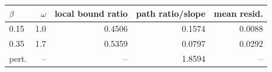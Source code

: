 \begin{tabular}{lrrrr}
\toprule
$\beta$ & $\omega$ & local bound ratio & path ratio/slope & mean resid. \\
\midrule
0.15 & 1.0 & 0.4506 & 0.1574 & 0.0088 \\
0.35 & 1.7 & 0.5359 & 0.0797 & 0.0292 \\
pert. & -- & -- & 1.8594 & -- \\
\bottomrule
\end{tabular}

